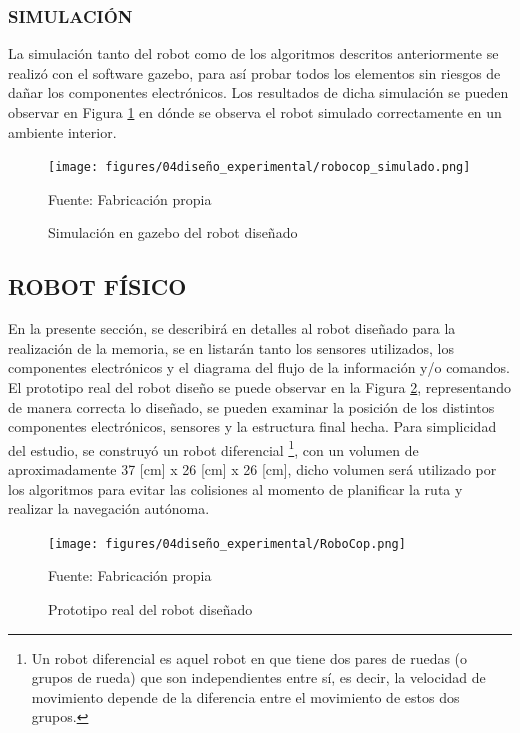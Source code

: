 \subsubsection{SIMULACIÓN}
La simulación tanto del robot como de los algoritmos descritos anteriormente se realizó con el software gazebo, para así probar todos los elementos sin riesgos de dañar los componentes electrónicos. Los resultados de dicha simulación se pueden observar en Figura \ref{fig:robocop_simulado} en dónde se observa el robot simulado correctamente en un ambiente interior.

\begin{figure}[H]
\centering
\texttt{[image: figures/04diseño\_experimental/robocop\_simulado.png]}
\caption{Simulación en gazebo del robot diseñado}
Fuente: Fabricación propia
\label{fig:robocop_simulado}
\end{figure}


\newpage
\subsection{ROBOT FÍSICO}
En la presente sección, se describirá en detalles al robot diseñado para la realización de la memoria, se en listarán tanto los sensores utilizados, los componentes electrónicos y el diagrama del flujo de la información y/o comandos. El prototipo real del robot diseño se puede observar en la Figura \ref{fig:robocop_real}, representando de manera correcta lo diseñado, se pueden examinar la posición de los distintos componentes electrónicos, sensores y la estructura final hecha. Para simplicidad del estudio, se construyó un robot diferencial \footnote{Un robot diferencial es aquel robot en que tiene dos pares de ruedas (o grupos de rueda) que son independientes entre sí, es decir, la velocidad de movimiento depende de la diferencia entre el movimiento de estos dos grupos.}, con un volumen de aproximadamente 37 [cm] x 26 [cm] x 26 [cm], dicho volumen será utilizado por los algoritmos para evitar las colisiones al momento de planificar la ruta y realizar la navegación autónoma.

\begin{figure}[H]
\centering
\texttt{[image: figures/04diseño\_experimental/RoboCop.png]}
\caption{Prototipo real del robot diseñado}
Fuente: Fabricación propia
\label{fig:robocop_real}
\end{figure}

